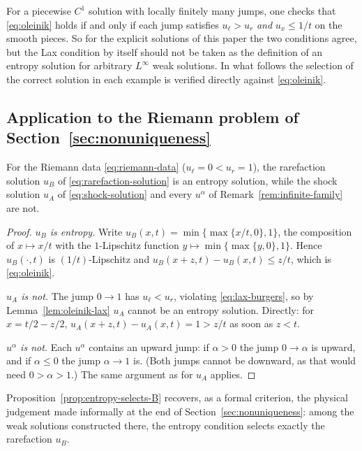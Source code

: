 \begin{remark}[Scope]
\label{rem:lax-vs-oleinik}
For a piecewise $C^1$ solution with locally finitely many jumps, one
checks that \eqref{eq:oleinik} holds if and only if each jump satisfies
$u_\ell>u_r$ \emph{and} $u_x\le 1/t$ on the smooth pieces. So for the
explicit solutions of this paper the two conditions agree, but the Lax
condition by itself should not be taken as the definition of an entropy
solution for arbitrary $L^\infty$ weak solutions. In what follows the
selection of the correct solution in each example is verified directly
against \eqref{eq:oleinik}.
\end{remark}

\subsection{Application to the Riemann problem of Section~\ref{sec:nonuniqueness}}
\label{subsec:entropy-application}

\begin{proposition}
\label{prop:entropy-selects-B}
For the Riemann data \eqref{eq:riemann-data} ($u_\ell=0<u_r=1$), the
rarefaction solution $u_B$ of \eqref{eq:rarefaction-solution} is an
entropy solution, while the shock solution $u_A$ of
\eqref{eq:shock-solution} and every $u^\alpha$ of
Remark~\ref{rem:infinite-family} are not.
\end{proposition}

\begin{proof}
\emph{$u_B$ is entropy.} Write $u_B(x,t)=\min\{\max\{x/t,0\},1\}$, the
composition of $x\mapsto x/t$ with the $1$-Lipschitz function
$y\mapsto\min\{\max\{y,0\},1\}$. Hence $u_B(\cdot,t)$ is $(1/t)$-Lipschitz
and $u_B(x+z,t)-u_B(x,t)\le z/t$, which is \eqref{eq:oleinik}.

\emph{$u_A$ is not.} The jump $0\to1$ has $u_\ell<u_r$, violating
\eqref{eq:lax-burgers}, so by Lemma~\ref{lem:oleinik-lax} $u_A$ cannot be
an entropy solution. Directly: for $x=t/2-z/2$, $u_A(x+z,t)-u_A(x,t)=1>z/t$
as soon as $z<t$.

\emph{$u^\alpha$ is not.} Each $u^\alpha$ contains an upward jump: if
$\alpha>0$ the jump $0\to\alpha$ is upward, and if $\alpha\le0$ the jump
$\alpha\to1$ is. (Both jumps cannot be downward, as that would need
$0>\alpha>1$.) The same argument as for $u_A$ applies.
\end{proof}

Proposition~\ref{prop:entropy-selects-B} recovers, as a formal criterion,
the physical judgement made informally at the end of
Section~\ref{sec:nonuniqueness}: among the weak solutions constructed
there, the entropy condition selects exactly the rarefaction $u_B$.

